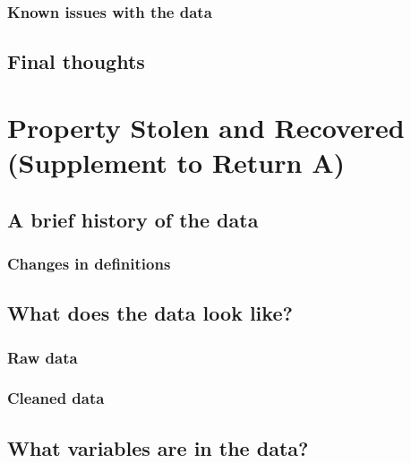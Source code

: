 \documentclass[
  12pt,
  openany]{book}
\begin{document}
\hypertarget{known-issues-with-the-data-3}{%
\subsection{Known issues with the data}\label{known-issues-with-the-data-3}}

\hypertarget{final-thoughts-3}{%
\section{Final thoughts}\label{final-thoughts-3}}

\hypertarget{stolen_property}{%
\chapter{Property Stolen and Recovered (Supplement to Return A)}\label{stolen_property}}

\hypertarget{a-brief-history-of-the-data-4}{%
\section{A brief history of the data}\label{a-brief-history-of-the-data-4}}

\hypertarget{changes-in-definitions-4}{%
\subsection{Changes in definitions}\label{changes-in-definitions-4}}

\hypertarget{what-does-the-data-look-like-4}{%
\section{What does the data look like?}\label{what-does-the-data-look-like-4}}

\hypertarget{raw-data-4}{%
\subsection{Raw data}\label{raw-data-4}}

\hypertarget{cleaned-data-4}{%
\subsection{Cleaned data}\label{cleaned-data-4}}

\hypertarget{what-variables-are-in-the-data-4}{%
\section{What variables are in the data?}\label{what-variables-are-in-the-data-4}}
\end{document}
